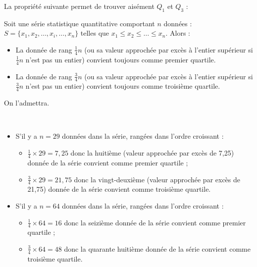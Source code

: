 
La propri\'et\'e suivante permet de trouver ais\'ement $Q_1$ et $Q_3$ :

\begin{prop}
Soit une s\'erie statistique quantitative comportant $n$ donn\'ees : $S=\{x_1,x_2,\ldots,x_i,\ldots,x_n\}$ telles que $x_1\leqslant x_2\leqslant\ldots \leqslant x_n$. Alors :
\begin{itemize}
	\item La donn\'ee de rang $\frac{1}{4}n$ (ou sa valeur approch\'ee par exc\`es \`a l'entier sup\'erieur si $\frac{1}{4}n$ n'est pas un entier) convient toujours comme premier quartile.
	\item La donn\'ee de rang $\frac{3}{4}n$ (ou sa valeur approch\'ee par exc\`es \`a l'entier sup\'erieur si $\frac{3}{4}n$ n'est pas un entier) convient toujours comme troisi\`eme quartile.
	\end{itemize}
\end{prop}

 On l'admettra.

\sautpage

\begin{exemples*} \label{statsexemple}~
\begin{itemize}
 \item S'il y a $n=29$ donn\'ees dans la s\'erie, rang\'ees dans l'ordre croissant :
\begin{itemize}
	\item $\frac{1}{4}\times29=7,25$ donc la huiti\`eme (valeur approch\'ee par exc\`es de 7,25) donn\'ee de la s\'erie convient comme premier quartile ;
	\item $\frac{3}{4}\times29=21,75$
	donc la vingt-deuxi\`eme (valeur approch\'ee par exc\`es de 21,75) donn\'ee de la s\'erie convient comme troisi\`eme quartile.
	\end{itemize}
 \item S'il y a $n=64$ donn\'ees dans la s\'erie, rang\'ees dans l'ordre croissant : 
\begin{itemize}
	\item $\frac{1}{4}\times64=16$
	donc la seizi\`eme donn\'ee de la s\'erie convient comme premier quartile ;
	\item $\frac{3}{4}\times64=48$
	donc la quarante huiti\`eme donn\'ee de la s\'erie convient comme troisi\`eme quartile.
	\end{itemize}
\end{itemize}



\end{exemples*}

